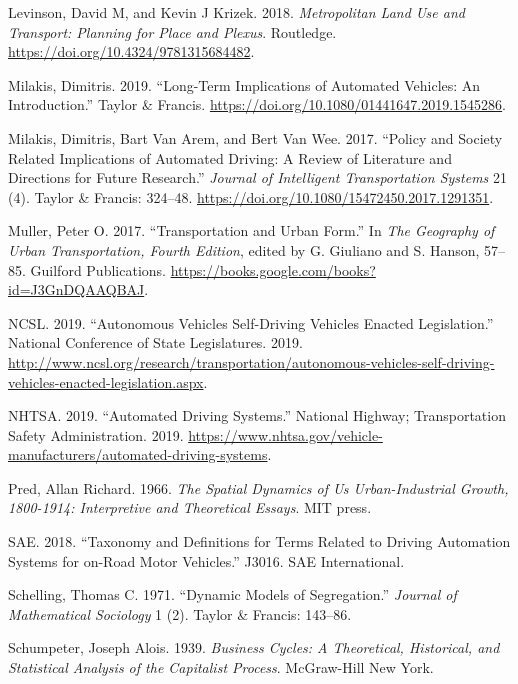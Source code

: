 \documentclass[12pt,]{article}
\begin{document}
\leavevmode\hypertarget{ref-levinson2018metropolitan}{}%
Levinson, David M, and Kevin J Krizek. 2018. \emph{Metropolitan Land Use
and Transport: Planning for Place and Plexus}. Routledge.
\url{https://doi.org/10.4324/9781315684482}.

\leavevmode\hypertarget{ref-milakis2019long}{}%
Milakis, Dimitris. 2019. ``Long-Term Implications of Automated Vehicles:
An Introduction.'' Taylor \& Francis.
\url{https://doi.org/10.1080/01441647.2019.1545286}.

\leavevmode\hypertarget{ref-milakis2017policy}{}%
Milakis, Dimitris, Bart Van Arem, and Bert Van Wee. 2017. ``Policy and
Society Related Implications of Automated Driving: A Review of
Literature and Directions for Future Research.'' \emph{Journal of
Intelligent Transportation Systems} 21 (4). Taylor \& Francis: 324--48.
\url{https://doi.org/10.1080/15472450.2017.1291351}.

\leavevmode\hypertarget{ref-Muller2017transportation}{}%
Muller, Peter O. 2017. ``Transportation and Urban Form.'' In \emph{The
Geography of Urban Transportation, Fourth Edition}, edited by G.
Giuliano and S. Hanson, 57--85. Guilford Publications.
\url{https://books.google.com/books?id=J3GnDQAAQBAJ}.

\leavevmode\hypertarget{ref-NCSL2019AV}{}%
NCSL. 2019. ``Autonomous Vehicles \textbar{} Self-Driving Vehicles
Enacted Legislation.'' National Conference of State Legislatures. 2019.
\url{http://www.ncsl.org/research/transportation/autonomous-vehicles-self-driving-vehicles-enacted-legislation.aspx}.

\leavevmode\hypertarget{ref-NHTSA2019ADS}{}%
NHTSA. 2019. ``Automated Driving Systems.'' National Highway;
Transportation Safety Administration. 2019.
\url{https://www.nhtsa.gov/vehicle-manufacturers/automated-driving-systems}.

\leavevmode\hypertarget{ref-pred1966spatial}{}%
Pred, Allan Richard. 1966. \emph{The Spatial Dynamics of Us
Urban-Industrial Growth, 1800-1914: Interpretive and Theoretical
Essays}. MIT press.

\leavevmode\hypertarget{ref-sae2018taxonomy}{}%
SAE. 2018. ``Taxonomy and Definitions for Terms Related to Driving
Automation Systems for on-Road Motor Vehicles.'' J3016. SAE
International.

\leavevmode\hypertarget{ref-schelling1971dynamic}{}%
Schelling, Thomas C. 1971. ``Dynamic Models of Segregation.''
\emph{Journal of Mathematical Sociology} 1 (2). Taylor \& Francis:
143--86.

\leavevmode\hypertarget{ref-schumpeter1939business}{}%
Schumpeter, Joseph Alois. 1939. \emph{Business Cycles: A Theoretical,
Historical, and Statistical Analysis of the Capitalist Process}.
McGraw-Hill New York.
\end{document}
